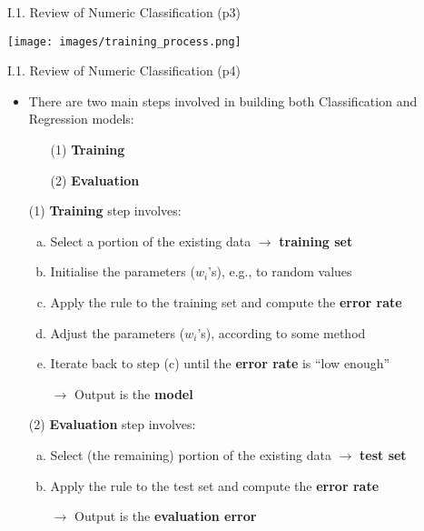 \documentclass[handout]{beamer}
\newcommand{\strong}[1]{\textbf{\color{teal} #1}}
\newcommand{\stronger}[1]{\textbf{\color{purple} #1}}
\begin{document}
\begin{frame}{I.1. Review of Numeric Classification (p3)}
\begin{center}
\texttt{[image: images/training\_process.png]}
\end{center}
\end{frame}
\begin{frame}{I.1. Review of Numeric Classification (p4)}
\begin{itemize}
\item There are two main steps involved in building both Classification and Regression models:
	\begin{itemize}
	\item[(1)] \stronger{Training}
	\item[(2)] \stronger{Evaluation}
	\end{itemize}
\item[]
\item[(1)] \stronger{Training} step involves:
	\begin{enumerate}[(a)] 
	\item Select a portion of the existing data $\rightarrow$ \strong{training set}
	\item Initialise the parameters ($w_i$'s), e.g., to random values
	\item Apply the rule to the training set and compute the \strong{error rate}
	\item Adjust the parameters ($w_i$'s), according to some method
	\item Iterate back to step {\color{beamer@blendedblue}(c)} until the \strong{error rate} is ``low enough''
	\item[$\rightarrow$] Output is the \stronger{model}
	\end{enumerate}
\item[]
\item[(2)] \stronger{Evaluation} step involves:
	\begin{enumerate}[(a)]
	\item Select (the remaining) portion of the existing data $\rightarrow$ \strong{test set}
	\item Apply the rule to the test set and compute the \strong{error rate}
	\item[$\rightarrow$] Output is the \stronger{evaluation error}
	\end{enumerate}
\end{itemize}
\end{frame}
\end{document}
